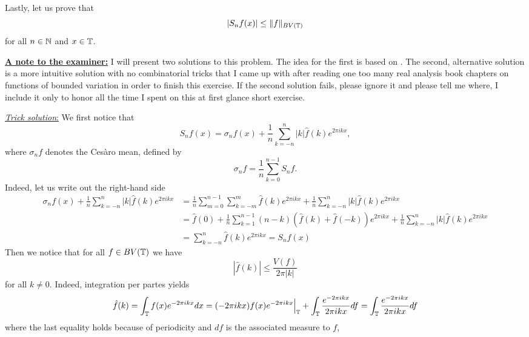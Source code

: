 \documentclass[a4paper, 12pt]{article}
\begin{document}
\begin{Exercise}
    Lastly, let us prove that
    \[
        |S_nf(x)| \leq \| f \|_{BV(\mathbb{T})}
    \]
    for all $n \in \mathbb{N}$ and $x \in \mathbb{T}$.

    \underline{\textbf{A note to the examiner:}}
    I will present two solutions to this problem.  The idea for the first is
    based on \cite[p.\ 52, Problem 11]{Butzer1971}.  The second, alternative
    solution is a more intuitive solution with no combinatorial tricks that I
    came up with after reading one too many real analysis book chapters on
    functions of bounded variation in order to finish this exercise.  If the
    second solution fails, please ignore it and please tell me where, I include
    it only to honor all the time I spent on this at first glance short
    exercise.

    \underline{\emph{Trick solution}:}
    We first notice that
    \begin{equation}
        \label{eq:15-cesaro}
        S_n f(x) = \sigma_n f(x) + \frac{1}{n} \sum_{k = -n}^{n} |k| \hat{f}(k) e^{2\pi i k x},
    \end{equation}
    where $\sigma_n f$ denotes the Ces\`aro mean, defined by
    \[
        \sigma_n f = \frac{1}{n} \sum_{k = 0}^{n-1} S_n f.
    \]
    Indeed, let us write out the right-hand side
    \begin{align*}
        \sigma_n f(x) + \frac{1}{n} \sum_{k = -n}^{n} |k| \hat{f}(k) e^{2\pi i k x}
        &= \frac{1}{n} \sum_{m = 0}^{n-1}\sum_{k = -m}^{m} \hat{f}(k) e^{2\pi i k x} + \frac{1}{n} \sum_{k = -n}^{n} |k| \hat{f}(k) e^{2\pi i k x} \\
        &= \hat{f}(0) +  \frac{1}{n} \sum_{k = 1}^{n-1}(n-k)\left( \hat{f}(k) + \hat{f}(-k) \right) e^{2\pi i k x} + \frac{1}{n} \sum_{k = -n}^{n} |k| \hat{f}(k) e^{2\pi i k x} \\
        &= \sum_{k = -n}^{n} \hat{f}(k) e^{2\pi i k x} = S_n f(x)
    \end{align*}
    Then we notice that for all $f \in BV(\mathbb{T})$ we have
    \begin{equation}
        \label{eq:15-bvcoef}
        |\hat{f}(k)| \leq \frac{V(f)}{2\pi|k|}
    \end{equation}
    for all $k \neq 0$.
    Indeed, integration per partes yields
    \[
        \hat{f}(k)
        = \int_{\mathbb{T}} f(x) e^{-2\pi i k x} dx
        = (-2\pi i k x)f(x) e^{-2\pi i k x} \Big|_{\mathbb{T}} + \int_{\mathbb{T}} \frac{e^{-2\pi i k x}}{2\pi i k x} df
        = \int_{\mathbb{T}} \frac{e^{-2\pi i k x}}{2\pi i k x} df
    \]
    where the last equality holds because of periodicity and $df$ is the associated measure to $f$,

\end{Exercise}
\end{document}
